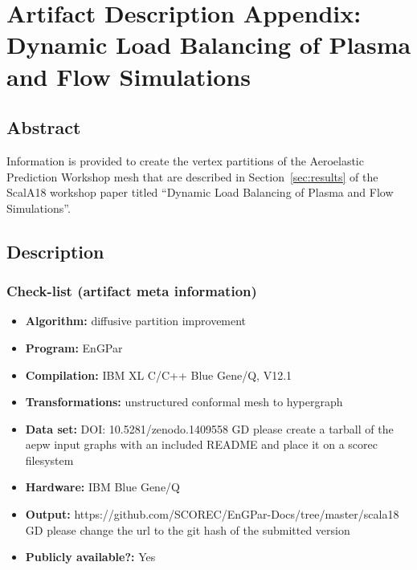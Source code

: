 \appendices

\section{Artifact Description Appendix: 
Dynamic Load Balancing of Plasma and Flow Simulations}

\subsection{Abstract}

Information is provided to create the vertex partitions of the Aeroelastic
Prediction Workshop mesh that are described in Section~\ref{sec:results} of the ScalA18
workshop paper titled ``Dynamic Load Balancing of Plasma and Flow Simulations''.

\subsection{Description}

\subsubsection{Check-list (artifact meta information)}

{\small
\begin{itemize}
  \item {\bf Algorithm: } diffusive partition improvement
  \item {\bf Program: } EnGPar
  \item {\bf Compilation: } IBM XL C/C++ Blue Gene/Q, V12.1
  \item {\bf Transformations: } unstructured conformal mesh to hypergraph
  \item {\bf Data set: } DOI: 10.5281/zenodo.1409558 {\color{red} GD please
    create a tarball of the aepw input graphs with an included README and place it on
    a scorec filesystem}
  \item {\bf Hardware: } IBM Blue Gene/Q
  \item {\bf Output: } https://github.com/SCOREC/EnGPar-Docs/tree/master/scala18
    {\color{red} GD please change the url to the git hash of the submitted version}
  \item {\bf Publicly available?: } Yes
\end{itemize}
}

